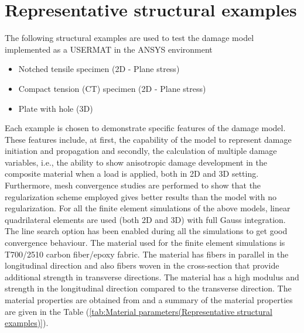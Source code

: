 \documentclass[12pt,a4paper,twoside,openright]{report}
\begin{document}
\section{Representative structural examples}
\indent\indent\indent The following structural examples are used to test the damage model implemented as a USERMAT in the ANSYS environment
\begin{itemize}
\item Notched tensile specimen (2D - Plane stress)
\item Compact tension (CT) specimen (2D - Plane stress)
\item Plate with hole (3D)
\end{itemize}
Each example is chosen to demonstrate specific features of the damage model. These features include, at first, the capability of the model to represent damage initiation and propagation and secondly, the calculation of multiple damage variables, i.e., the ability to show anisotropic damage development in the composite material when a load is applied, both in 2D and 3D setting. Furthermore, mesh convergence studies are performed to show that the regularization scheme employed gives better results than the model with no regularization. For all the finite element simulations of the above models, linear quadrilateral elements are used (both 2D and 3D) with full Gauss integration. The line search option has been enabled during all the simulations to get good convergence behaviour. The material used for the finite element simulations is T700/2510 carbon fiber/epoxy fabric. The material has fibers in parallel in the longitudinal direction and also fibers woven in the cross-section that provide additional strength in transverse directions. The material has a high modulus and strength in the longitudinal direction compared to the transverse direction. The material properties are obtained from \citep{jiang2018evaluations} and a summary of the material properties are given in the Table (\ref{tab:Material parameters(Representative structural examples)}). \\
\end{document}
